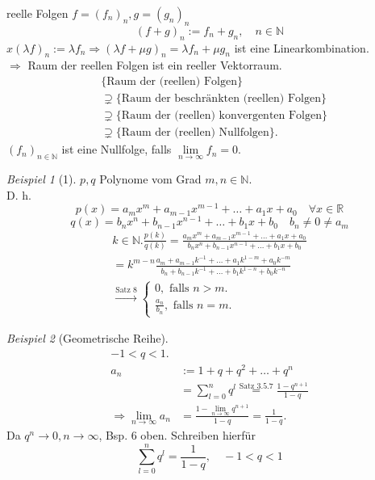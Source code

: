 \documentclass[12pt,a4paper,titlepage]{article} %
\theoremstyle{definition}
\theoremstyle{remark}
\newtheorem*{bsp}{Beispiel}
\newcommand{\N}{\mathbb{N}}
\newcommand{\R}{\mathbb{R}}
\begin{document}
reelle Folgen \(f = (f_n)_n, g = (g_n)_n  \)\\
\[ (f+g)_n := f_n + g_n, \quad n\in\N \]
\(x (\lambda f)_n := \lambda f_n \Rightarrow ( \lambda f + \mu g )_n = \lambda f_n + \mu g_n \) ist eine Linearkombination.\\
\(\Rightarrow\) Raum der reellen Folgen ist ein reeller Vektorraum.
\begin{align*}
	&\{ \text{Raum der (reellen) Folgen} \}\\
	&\supsetneq \{ \text{Raum der beschränkten (reellen) Folgen} \}\\
	&\supsetneq \{ \text{Raum der (reellen) konvergenten Folgen} \}\\
	&\supsetneq \{ \text{Raum der (reellen) Nullfolgen} \}.
\end{align*}
\((f_n)_{n\in\N}\) ist eine Nullfolge, falls \( \lim\limits_{n\rightarrow\infty} f_n = 0 \).
\begin{bsp}[1]
	\(p,q\) Polynome vom Grad \(m,n\in\N\).\\
	D. h. \[ p(x) = a_m x^m + a_{m-1} x^{m-1} + \ldots + a_1 x + a_0 \quad \forall x\in\R \]
	\[q(x) = b_n x^n + b_{n-1} x^{n-1} + \ldots + b_1 x + b_0 \quad b_n \neq 0 \neq a_m \]
	\begin{align*}
		k\in\N. \frac{p(k)}{q(k)} = \frac{a_m x^m + a_{m-1} x^{m-1} + \ldots + a_1 x + a_0}{b_n x^n + b_{n-1} x^{n-1} + \ldots + b_1 x + b_0}\\
		= k^{m-n} \frac{a_m + a_{m-1} k^{-1} + \ldots + a_1 k^{1-m} + a_0 k^{-m} }{b_n + b_{n-1} k^{-1} + \ldots + b_1 k^{1-n} + b_0 k^{-n}}\\
		\overset{\text{Satz 8}}{\longrightarrow}
		\begin{cases}
			0, \text{ falls } n>m.\\
			\frac{a_n}{b_n}, \text{ falls } n = m.
		\end{cases}
	\end{align*}
\end{bsp}
\begin{bsp}[Geometrische Reihe]
	\begin{align*}
		-1<q<1.\\
		a_n &:= 1 + q + q^2 + \ldots + q^n\\
		&= \sum_{l=0}^{n} q^l \overset{\text{Satz 3.5.7}}{=} \frac{1-q^{n+1}}{1-q}\\
		\Rightarrow \lim\limits_{n\rightarrow\infty} a_n &= \frac{1- \lim\limits_{n\rightarrow\infty} q^{n+1}}{1-q} = \frac{1}{1-q}.
	\end{align*}
	Da \(q^n \rightarrow 0, n\rightarrow\infty \), Bsp. 6 oben.
	Schreiben hierfür \[ \sum_{l=0}^{n} q^l = \frac{1}{1-q}, \quad -1<q<1 \]
\end{bsp}
\end{document}
